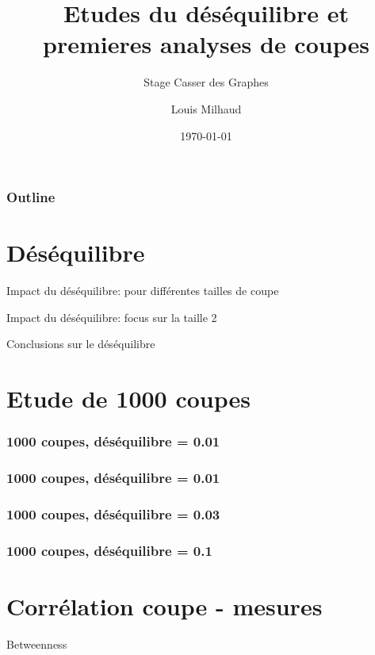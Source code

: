 \documentclass[aspectratio=169]{beamer}
\title{Etudes du déséquilibre et premieres analyses de coupes}
\subtitle{Stage Casser des Graphes}
\author{Louis Milhaud}
\institute{Complex Networks - LIP6}
\date{\today}
\begin{document}
    \begin{frame}
        \titlepage
    \end{frame}

    \begin{frame}
        \frametitle{Outline}
        \tableofcontents
    \end{frame}

    \section{Déséquilibre}
    \begin{frame}{Impact du déséquilibre: pour différentes tailles de coupe}
    \end{frame}

    \begin{frame}{Impact du déséquilibre: focus sur la taille 2}
    \end{frame}

    \begin{frame}{Conclusions sur le déséquilibre}
    \end{frame}

    \section{Etude de 1000 coupes}
    \begin{frame}
        \frametitle{1000 coupes, déséquilibre = 0.01}
    \end{frame}

    \begin{frame}
        \frametitle{1000 coupes, déséquilibre = 0.01}
    \end{frame}

    \begin{frame}
        \frametitle{1000 coupes, déséquilibre = 0.03}
    \end{frame}

    \begin{frame}
        \frametitle{1000 coupes, déséquilibre = 0.1}
    \end{frame}
    \section{Corrélation coupe - mesures}

    \begin{frame}{Betweenness}
    \end{frame}
\end{document}
